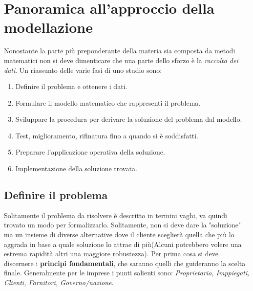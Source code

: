 \documentclass{article}
\begin{document}
\section{Panoramica all'approccio della modellazione}
Nonostante la parte più preponderante della materia sia composta da metodi matematici non si deve dimenticare che una parte dello sforzo è la \textit{raccolta dei dati}.
Un riassunto delle varie fasi di uno studio sono:
\begin{enumerate}
  \item Definire il problema e ottenere i dati.
  \item Formulare il modello matematico che rappresenti il problema.
  \item Sviluppare la procedura per derivare la soluzione del problema dal modello.
  \item Test, miglioramento, rifinatura fino a quando si è soddisfatti.
  \item Preparare l'applicazione operativa della soluzione.
  \item Implementazione della soluzione trovata.
\end{enumerate}

\subsection{Definire il problema}
Solitamente il problema da risolvere è descritto in termini vaghi, va quindi trovato un modo per formalizzarlo. Solitamente, non si deve dare la "soluzione" ma un insieme di diverse alternative dove il cliente sceglierà quella che più lo aggrada in base a quale soluzione lo attrae di più(Alcuni potrebbero volere una estrema rapidità altri una maggiore robustezza). Per prima cosa si deve discernere i \textbf{principi fondamentali}, che saranno quelli che guideranno la scelta finale. Generalmente per le imprese i punti salienti sono: \textit{Proprietario, Imppiegati, Clienti, Fornitori, Governo/nazione}.
\end{document}
